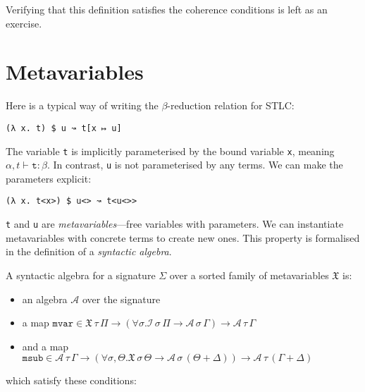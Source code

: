 \documentclass[11pt,a4paper]{article}
\newcommand*\ctxext[2]{{#1} + {#2}}
\newcommand*\ctxcons[2]{{#1}, {#2}}
\newcommand*\InFamily[4]{\ensuremath{{#2} \vdash^{#1} {#3} : {#4}}}
\newcommand*\Litt[1]{\texttt{#1}}
\begin{document}
Verifying that this definition satisfies the coherence conditions is left as an
exercise\footnotemark{}.


\section{Metavariables}

Here is a typical way of writing the \(\beta\)-reduction relation for STLC:\@

\begin{verbatim}
(λ x. t) $ u ↝ t[x ↦ u]
\end{verbatim}

The variable \verb|t| is implicitly parameterised by the bound variable
\verb|x|, meaning \InFamily{}{\ctxcons{\alpha}{t}}{\Litt{t}}{\beta}. In contrast,
\verb|u| is not parameterised by any terms. We can make the parameters explicit:

\begin{verbatim}
(λ x. t<x>) $ u<> ↝ t<u<>>
\end{verbatim}

\verb|t| and \verb|u| are \emph{metavariables}---free variables with parameters.
We can instantiate metavariables with concrete terms to create new ones. This
property is formalised in the definition of a \emph{syntactic algebra}.

A syntactic algebra for a signature \(\Sigma\) over a sorted family of metavariables
\(\mathfrak{X}\) is:

\begin{itemize}
\item an algebra \(\mathcal{A}\) over the signature
\item a map \(\mathtt{mvar} \in {{\mathfrak{X}\,\tau\,\Pi} \to (\forall \sigma. {{\mathcal{I}\,\sigma\,\Pi} \to {\mathcal{A}\,\sigma\,\Gamma}}) \to
  {\mathcal{A}\,\tau\,\Gamma}}\)
\item and a map \(\mathtt{msub} \in {{\mathcal{A}\,\tau\,\Gamma} \to (\forall {\sigma, \Theta}. {{\mathfrak{X}\,\sigma\,\Theta} \to
  {\mathcal{A}\,\sigma\,(\ctxext{\Theta}{\Delta})}}) \to {\mathcal{A}\,\tau\,(\ctxext{\Gamma}{\Delta})}}\)
\end{itemize}

which satisfy these conditions\footnotemark{}:

\end{document}
